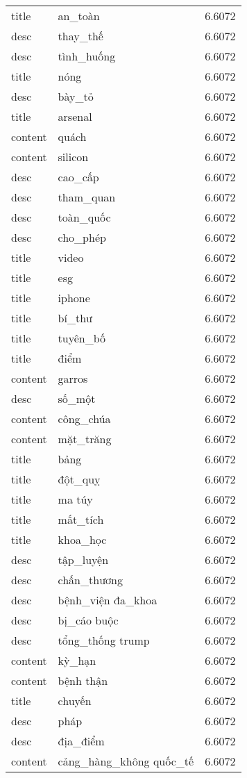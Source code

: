 \documentclass{article}
\begin{document}
\begin{tabular}{lll}
title & an\_toàn & 6.6072\\
desc & thay\_thế & 6.6072\\
desc & tình\_huống & 6.6072\\
title & nóng & 6.6072\\
desc & bày\_tỏ & 6.6072\\
title & arsenal & 6.6072\\
content & quách & 6.6072\\
content & silicon & 6.6072\\
desc & cao\_cấp & 6.6072\\
desc & tham\_quan & 6.6072\\
desc & toàn\_quốc & 6.6072\\
desc & cho\_phép & 6.6072\\
title & video & 6.6072\\
title & esg & 6.6072\\
title & iphone & 6.6072\\
title & bí\_thư & 6.6072\\
title & tuyên\_bố & 6.6072\\
title & điểm & 6.6072\\
content & garros & 6.6072\\
desc & số\_một & 6.6072\\
content & công\_chúa & 6.6072\\
content & mặt\_trăng & 6.6072\\
title & bảng & 6.6072\\
title & đột\_quỵ & 6.6072\\
title & ma túy & 6.6072\\
title & mất\_tích & 6.6072\\
title & khoa\_học & 6.6072\\
desc & tập\_luyện & 6.6072\\
desc & chấn\_thương & 6.6072\\
desc & bệnh\_viện đa\_khoa & 6.6072\\
desc & bị\_cáo buộc & 6.6072\\
desc & tổng\_thống trump & 6.6072\\
content & kỳ\_hạn & 6.6072\\
content & bệnh thận & 6.6072\\
title & chuyến & 6.6072\\
desc & pháp & 6.6072\\
desc & địa\_điểm & 6.6072\\
content & cảng\_hàng\_không quốc\_tế & 6.6072\\

\end{tabular}
\end{document}
